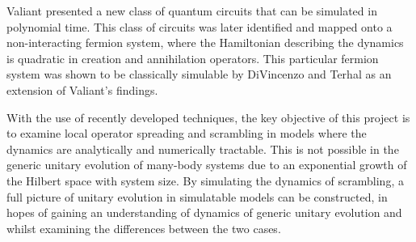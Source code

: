 Valiant \cite{Valiant2001QuantumCT} presented a new class of quantum circuits that can be simulated in
polynomial time. This class of circuits was later identified and mapped onto a non-interacting fermion system, where the Hamiltonian
describing the dynamics is quadratic in creation and annihilation operators. This particular fermion
system was shown to be classically simulable by DiVincenzo and Terhal \cite{Terhal2001} as an extension of Valiant's findings.

With the use of recently developed techniques, the key objective of this project is to examine local
operator spreading and scrambling in models where the dynamics are analytically and numerically tractable. This is not
possible in the generic unitary evolution of many-body systems due to an exponential growth of
the Hilbert space with system size. By simulating the dynamics of scrambling, a full picture of unitary evolution
in simulatable models can be constructed, in hopes of gaining an understanding of dynamics of generic unitary evolution and
whilst examining the differences between the two cases.



